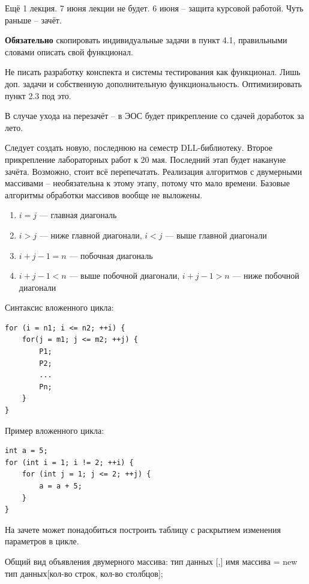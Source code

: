 \documentclass{article}
\begin{document}
Ещё 1 лекция. 7 июня лекции не будет. 6 июня – защита курсовой работой. Чуть раньше – зачёт.

\hfill

\textbf{Обязательно} скопировать индивидуальные задачи в пункт 4.1, правильными словами описать свой функционал.

Не писать разработку конспекта и системы тестирования как функционал. Лишь доп. задачи и собственную дополнительную функциональность. Оптимизировать пункт 2.3 под это.

В случае ухода на перезачёт – в ЭОС будет прикрепление со сдачей доработок за лето.

\hfill

Следует создать новую, последнюю на семестр DLL-библиотеку. Второе прикрепление лабораторных работ к 20 мая. Последний этап будет накануне зачёта. Возможно, стоит всё перепечатать. Реализация алгоритмов с двумерными массивами – необязательна к этому этапу, потому что мало времени. Базовые алгоритмы обработки массивов вообще не выложены.

\begin{enumerate}
    \item $i = j$ — главная диагональ
    \item $i > j$ — ниже главной диагонали, $i < j$ — выше главной диагонали
    \item $i + j - 1 = n$ — побочная диагональ
    \item $i + j - 1 < n$ — выше побочной диагонали, $i + j - 1 > n$ — ниже побочной диагонали
\end{enumerate}

Синтаксис вложенного цикла:

\begin{verbatim}
for (i = n1; i <= n2; ++i) {
    for(j = m1; j <= m2; ++j) {
        P1;
        P2;
        ...
        Pn;
    }
}
\end{verbatim}

Пример вложенного цикла:

\begin{verbatim}
int a = 5;
for (int i = 1; i != 2; ++i) {
    for (int j = 1; j <= 2; ++j) {
        a = a + 5;
    }
}
\end{verbatim}

На зачете может понадобиться построить таблицу с раскрытием изменения параметров в цикле.

\hfill

Общий вид объявления двумерного массива: тип данных [,] имя массива = new тип данных[кол-во строк, кол-во столбцов];
\end{document}
